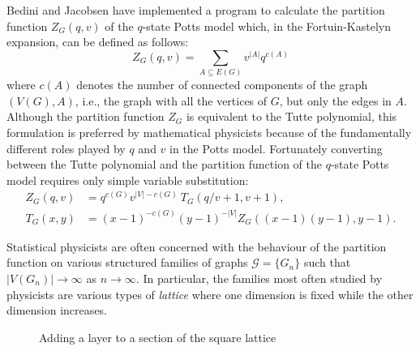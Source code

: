 Bedini and Jacobsen \cite{BJ10} have implemented a program to calculate the partition function $Z_G(q,v)$ of the $q$-state Potts model which, in the Fortuin-Kastelyn expansion, can be defined as follows:
\begin{equation}\label{zqv}
Z_{G}(q,v) = \sum_{A \subseteq E(G)} v^{|A|} q^{c(A)}
\end{equation}
where $c(A)$ denotes the number of connected components of the graph $(V(G),A)$, i.e., the graph with all the vertices of $G$, but only the edges in $A$. Although the partition function $Z_G$ is equivalent to the Tutte polynomial, this formulation is preferred by mathematical physicists because of the fundamentally different roles played by $q$ and $v$ in the Potts model. Fortunately converting between the Tutte polynomial and the partition function of the $q$-state Potts model requires only simple variable substitution:
\begin{align*}
Z_G(q,v) &= q^{c(G)} v^{|V|-c(G)} \ T_G \left( q/v +1,v+1 \right),\\
T_G(x,y) &= (x-1)^{-c(G)} (y-1)^{-|V|} Z_G((x-1)(y-1),y-1).
\end{align*}

Statistical physicists are often concerned with the behaviour of the partition function on various structured families of graphs 
$\mathcal{G} = \{G_n\}$ such that $|V(G_n)| \rightarrow \infty$ as $n \rightarrow \infty$. In particular, the families most often 
studied by physicists are various types of {\em lattice} where one dimension is fixed while the other dimension
increases. %

\begin{figure}
\begin{center}
\end{center}
\caption{Adding a layer to  a section of the square lattice}
\label{extending}
\end{figure}

